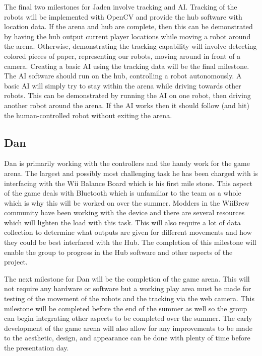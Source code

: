 \documentclass[11pt]{ieeeconf}
\begin{document}
The final two milestones for Jaden involve tracking and AI. Tracking of the robots will be implemented with OpenCV and provide the hub software with location data. If the arena and hub are complete, then this can be demonstrated by having the hub output current player locations while moving a robot around the arena. Otherwise, demonstrating the tracking capability will involve detecting colored pieces of paper, representing our robots, moving around in front of a camera. Creating a basic AI using the tracking data will be the final milestone. The AI software should run on the hub, controlling a robot autonomously. A basic AI will simply try to stay within the arena while driving towards other robots. This can be demonstrated by running the AI on one robot, then driving another robot around the arena. If the AI works then it should follow (and hit) the human-controlled robot without exiting the arena.


\subsection{Dan}
Dan is primarily working with the controllers and the handy work for the game arena. The largest and possibly most challenging task he has been charged with is interfacing with the Wii Balance Board which is his first mile stone. This aspect of the game deals with Bluetooth which is unfamiliar to the team as a whole which is why this will be worked on over the summer. Modders in the WiiBrew \cite{homebrew} community have been working with the device and there are several resources which will lighten the load with this task. This will also require a lot of data collection to determine what outputs are given for different movements and how they could be best interfaced with the Hub. The completion of this milestone will enable the group to progress in the Hub software and other aspects of the project.

The next milestone for Dan will be the completion of the game arena. This will not require any hardware or software but a working play area must be made for testing of the movement of the robots and the tracking via the web camera. This milestone will be completed before the end of the summer as well so the group can begin integrating other aspects to be completed over the summer. The early development of the game arena will also allow for any improvements to be made to the aesthetic, design, and appearance can be done with plenty of time before the presentation day.
\end{document}
